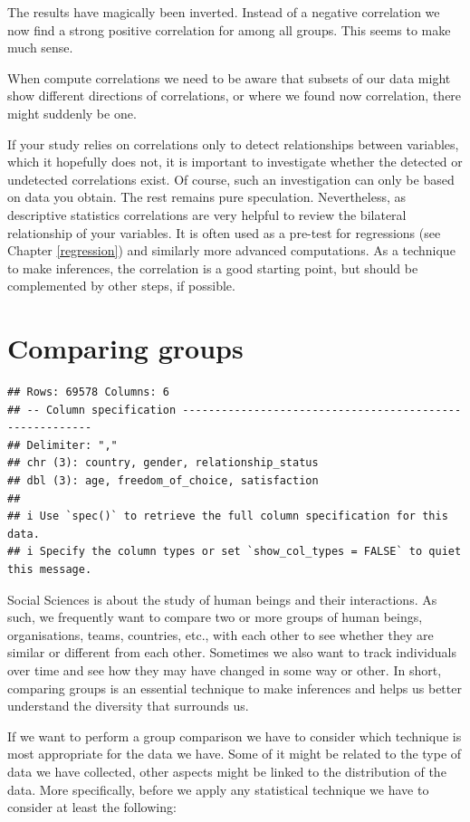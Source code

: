 \documentclass[
]{book}
\begin{document}
The results have magically been inverted. Instead of a negative correlation we now find a strong positive correlation for among all groups. This seems to make much sense.

When compute correlations we need to be aware that subsets of our data might show different directions of correlations, or where we found now correlation, there might suddenly be one.

If your study relies on correlations only to detect relationships between variables, which it hopefully does not, it is important to investigate whether the detected or undetected correlations exist. Of course, such an investigation can only be based on data you obtain. The rest remains pure speculation. Nevertheless, as descriptive statistics correlations are very helpful to review the bilateral relationship of your variables. It is often used as a pre-test for regressions (see Chapter \ref{regression}) and similarly more advanced computations. As a technique to make inferences, the correlation is a good starting point, but should be complemented by other steps, if possible.

\hypertarget{comparing-groups}{%
\chapter{Comparing groups}\label{comparing-groups}}

\begin{verbatim}
## Rows: 69578 Columns: 6
## -- Column specification --------------------------------------------------------
## Delimiter: ","
## chr (3): country, gender, relationship_status
## dbl (3): age, freedom_of_choice, satisfaction
## 
## i Use `spec()` to retrieve the full column specification for this data.
## i Specify the column types or set `show_col_types = FALSE` to quiet this message.
\end{verbatim}

Social Sciences is about the study of human beings and their interactions. As such, we frequently want to compare two or more groups of human beings, organisations, teams, countries, etc., with each other to see whether they are similar or different from each other. Sometimes we also want to track individuals over time and see how they may have changed in some way or other. In short, comparing groups is an essential technique to make inferences and helps us better understand the diversity that surrounds us.

If we want to perform a group comparison we have to consider which technique is most appropriate for the data we have. Some of it might be related to the type of data we have collected, other aspects might be linked to the distribution of the data. More specifically, before we apply any statistical technique we have to consider at least the following:
\end{document}
